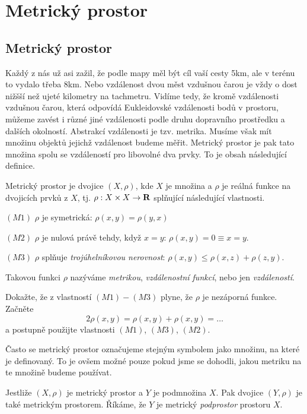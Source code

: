 \chapter{Metrický prostor}

\section{Metrický prostor}
  Každý z nás už asi zažil, že podle mapy měl být cíl vaší cesty 5km, ale v terénu to vydalo třeba 8km. Nebo vzdálenost 
  dvou měst vzdušnou čarou je vždy o dost nižšší než ujeté kilometry na tachmetru. Vidíme tedy, že kromě vzdálenosti vzdušnou čarou,
  která odpovídá Eukleidovské vzdálenosti bodů v prostoru, můžeme zavést i různé jiné vzdálenosti podle druhu dopravního prostředku a 
  dalších okolností. Abstrakcí vzdálenosti je tzv. metrika. Musíme však mít množinu objektů jejichž vzdálenost budeme měřit. 
  Metrický prostor je pak tato množina spolu se vzdáleností pro libovolné dva prvky. To je obsah následující definice.

  \begin{definition}
   Metrický prostor je dvojice  $(X, \rho)$, kde $X$ je množina a $\rho$ je reálná funkce na dvojicích prvků z $X$, tj.
   $ \rho: X\times X \rightarrow {\rm\bf R}$ splňující následující vlastnosti.
   \begin{description}
        \item $(M1)$ $\rho$ je symetrická: $\rho(x,y) = \rho(y,x)$
        \item $(M2)$ $\rho$ je nulová právě tehdy, když $x=y$: $\rho(x,y) = 0 \equiv x=y$.
        \item $(M3)$ $\rho$ splňuje {\it trojúhelníkovou nerovnost}: $\rho(x,y)\le\rho(x,z)+\rho(z,y)$.
   \end{description}
   Takovou funkci $\rho$ nazýváme {\it metrikou}, {\it vzdálenostní funkcí}, nebo jen {\it vzdáleností}.
  \end{definition}
  \begin{exercise}
  Dokažte, že z vlastností $(M1) - (M3)$ plyne, že $\rho$ je nezáporná funkce. Začněte 
  \[2\rho(x,y) = \rho(x,y)+\rho(x,y)= \dots\]
  a postupně použijte vlastnosti $(M1)$, $(M3)$, $(M2)$.
  \end{exercise}

  Často se metrický prostor označujeme stejným symbolem jako množinu, na které je definovaný. To je ovšem možné pouze pokud
  jsme se dohodli, jakou metriku na te množině budeme používat.

  \begin{remark} \label{metricky_podprostor}
        Jestliže $(X,\rho)$ je metrický prostor a $Y$ je podmnožina $X$. Pak dvojice $(Y,\rho)$ je také metrickým prostorem.
        Říkáme, že $Y$ je metrický {\it podprostor} prostoru $X$.
  \end{remark}
  
